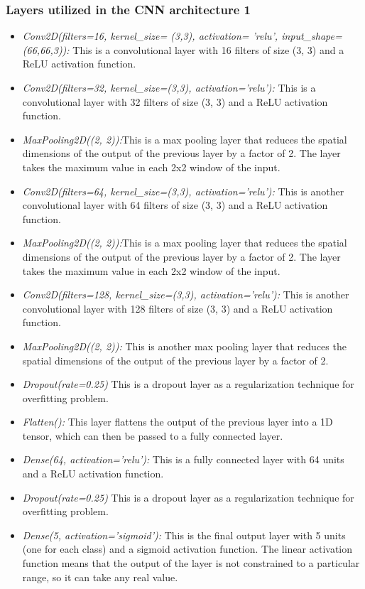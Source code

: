 \subsubsection{Layers utilized in the CNN architecture 1}
\begin{itemize}
    \item \textit{Conv2D(filters=16, kernel_size= (3,3), activation= 'relu', input_shape=(66,66,3)):} This is a convolutional layer with 16 filters of size (3, 3) and a ReLU activation function.
    \item \textit{Conv2D(filters=32, kernel_size=(3,3), activation='relu'):} This is a convolutional layer with 32 filters of size (3, 3) and a ReLU activation function.
    \item \textit{MaxPooling2D((2, 2)):}This is a max pooling layer that reduces the spatial dimensions of the output of the previous layer by a factor of 2. The layer takes the maximum value in each 2x2 window of the input.
    \item \textit{Conv2D(filters=64, kernel_size=(3,3), activation='relu'):} This is another convolutional layer with 64 filters of size (3, 3) and a ReLU activation function.
    \item \textit{MaxPooling2D((2, 2)):}This is a max pooling layer that reduces the spatial dimensions of the output of the previous layer by a factor of 2. The layer takes the maximum value in each 2x2 window of the input.
    \item \textit{Conv2D(filters=128, kernel_size=(3,3), activation='relu'):} This is another convolutional layer with 128 filters of size (3, 3) and a ReLU activation function.
    \item \textit{MaxPooling2D((2, 2)):}  This is another max pooling layer that reduces the spatial dimensions of the output of the previous layer by a factor of 2.
    \item \textit{Dropout(rate=0.25)}  This is a dropout layer as a regularization technique for overfitting problem.
    \item \textit{Flatten():} This layer flattens the output of the previous layer into a 1D tensor, which can then be passed to a fully connected layer.
    \item \textit{Dense(64, activation='relu'):}  This is a fully connected layer with 64 units and a ReLU activation function.
    \item \textit{Dropout(rate=0.25)}  This is a dropout layer as a regularization technique for overfitting problem.
    \item \textit{Dense(5, activation='sigmoid'):} This is the final output layer with 5 units (one for each class) and a sigmoid activation function. The linear activation function means that the output of the layer is not constrained to a particular range, so it can take any real value.
    
\end{itemize}

